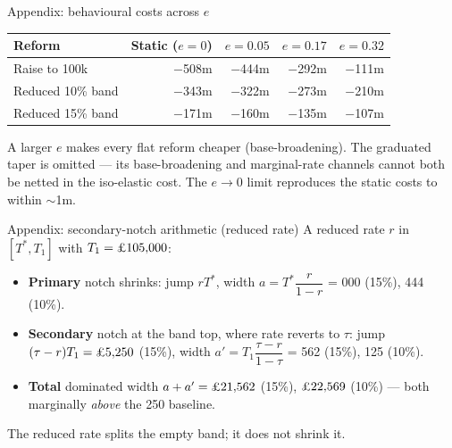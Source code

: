 \documentclass[aspectratio=169]{beamer}
\newcommand{\back}[1]{\hfill{\footnotesize\hyperlink{#1}{\beamergotobutton{back}}}}
\renewcommand{\pounds}{\ifmmode\text{\textsterling}\else\textsterling\fi}
\begin{document}
\begin{frame}{Appendix: behavioural costs across $e$}
  \hypertarget{slide:behav_table}{}
  \begin{center}
    \footnotesize
    \renewcommand{\arraystretch}{1.3}
    \begin{tabular}{@{}l r r r r@{}}
      \toprule
      \textbf{Reform} & \textbf{Static ($e{=}0$)} & $e{=}0.05$ & $e{=}0.17$ & $e{=}0.32$ \\
      \midrule
      Raise to \pounds100k & $-$\pounds508m & $-$\pounds444m & $-$\pounds292m & $-$\pounds111m \\
      Reduced 10\% band    & $-$\pounds343m & $-$\pounds322m & $-$\pounds273m & $-$\pounds210m \\
      Reduced 15\% band    & $-$\pounds171m & $-$\pounds160m & $-$\pounds135m & $-$\pounds107m \\
      \bottomrule
    \end{tabular}
  \end{center}
  \vspace{0.25cm}
  {\footnotesize A larger $e$ makes every flat reform cheaper (base-broadening).
  The graduated taper is omitted --- its base-broadening and marginal-rate
  channels cannot both be netted in the iso-elastic cost. The $e\to0$ limit
  reproduces the static costs to within $\sim$\pounds1m.}
  \back{slide:menu}
\end{frame}

\begin{frame}{Appendix: secondary-notch arithmetic (reduced rate)}
  \hypertarget{slide:secondary}{}
  \footnotesize
  A reduced rate $r$ in $[T^{*},T_1]$ with $T_1=\pounds105{,}000$:
  \begin{itemize}\itemsep0.3cm
    \item \textbf{Primary} notch shrinks: jump $rT^{*}$, width
      $a = T^{*}\dfrac{r}{1-r}$ \;=\; \pounds15{,}000 (15\%), \pounds9{,}444 (10\%).
    \item \textbf{Secondary} notch at the band top, where rate reverts to $\tau$:
      jump $(\tau-r)T_1=\pounds5{,}250$ (15\%), width
      $a' = T_1\dfrac{\tau-r}{1-\tau}$ \;=\; \pounds6{,}562 (15\%), \pounds13{,}125 (10\%).
    \item \textbf{Total} dominated width $a+a' = \pounds21{,}562$ (15\%),
      $\pounds22{,}569$ (10\%) --- both marginally \emph{above} the
      \pounds21{,}250 baseline.
  \end{itemize}
  \begin{center}\alert{The reduced rate splits the empty band; it does not shrink it.}\end{center}
  \back{slide:dominated}
\end{frame}
\end{document}
